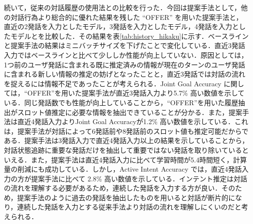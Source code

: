 続いて，従来の対話履歴の使用法との比較を行った．今回は提案手法として，他の対話行為より総合的に優れた結果を残した “OFFER” を用いた提案手法と，直近の2発話を入力としたモデル，3発話を入力としたモデル，4発話を入力としたモデルとを比較した．その結果を表\ref{tab:history_hikaku}に示す．ベースラインと提案手法の結果はミニバッチサイズを下げたことで変化している．直近3発話入力ではベースラインと比べて少ししか性能が向上していない．原因としては，1つ前のユーザ発話に含まれる既に推定済みの情報が現在のターンのユーザ発話に含まれる新しい情報の推定の妨げとなったことと，直近3発話では対話の流れを捉えるには情報不足であったことが考えられる．Joint Goal Accuracy に関しては，“OFFER”を用いた提案手法が直近3発話入力より5.7\% 高い数値を示している．同じ発話数でも性能が向上していることから，“OFFER”を用いた履歴抽出がスロット値推定に必要な情報を抽出できていることが分かる．また，提案手法は直近4発話入力よりJoint Goal Accuracyが1.2\% 高い数値を示している．これは，提案手法が対話によって6発話前や8発話前のスロット値も推定可能だからである．提案手法は3発話入力で直近4発話入力以上の結果を示していることから，対話状態追跡に重要な発話だけを抽出して重要ではない発話を取り除いているといえる．また，提案手法は直近4発話入力に比べて学習時間が5.4時間短く，計算量の削減にも成功している．しかし，Active Intent Accuracy では，直近4発話入力の方が提案手法に比べて 2.8\% 高い数値を示している．インテント推定は対話の流れを理解する必要があるため，連続した発話を入力する方が良い．そのため，提案手法のように過去の発話を抽出したものを用いると対話が断片的になり，連続した発話を入力とする従来手法より対話の流れを理解しにくいのだと考えられる．